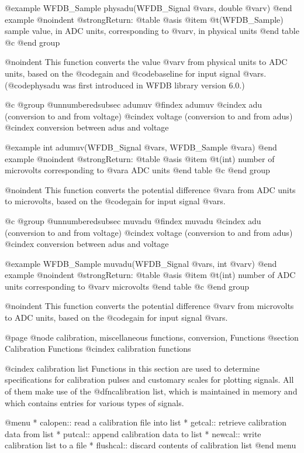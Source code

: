 {{{{{{{{@example
WFDB_Sample physadu(WFDB_Signal @var{s}, double @var{v})
@end example
@noindent
@strong{Return:}
@table @asis
@item @t{(WFDB_Sample)}
sample value, in ADC units, corresponding to @var{v}, in physical units
@end table
@c @end group

@noindent
This function converts the value @var{v} from physical units to ADC
units, based on the @code{gain} and @code{baseline} for input signal
@var{s}.  (@code{physadu} was first introduced in WFDB library version
6.0.)

@c @group
@unnumberedsubsec adumuv
@findex adumuv
@cindex adu (conversion to and from voltage)
@cindex voltage (conversion to and from adus)
@cindex conversion between adus and voltage

@example
int adumuv(WFDB_Signal @var{s}, WFDB_Sample @var{a})
@end example
@noindent
@strong{Return:}
@table @asis
@item @t{(int)}
number of microvolts corresponding to @var{a} ADC units
@end table
@c @end group

@noindent
This function converts the potential difference @var{a} from ADC units to
microvolts, based on the @code{gain} for input signal @var{s}.

@c @group
@unnumberedsubsec muvadu
@findex muvadu
@cindex adu (conversion to and from voltage)
@cindex voltage (conversion to and from adus)
@cindex conversion between adus and voltage

@example
WFDB_Sample muvadu(WFDB_Signal @var{s}, int @var{v})
@end example
@noindent
@strong{Return:}
@table @asis
@item @t{(int)}
number of ADC units corresponding to @var{v} microvolts
@end table
@c @end group

@noindent
This function converts the potential difference @var{v} from microvolts
to ADC units, based on the @code{gain} for input signal @var{s}.

@page
@node     calibration, miscellaneous functions, conversion, Functions
@section Calibration Functions
@cindex calibration functions

@cindex calibration list
Functions in this section are used to determine specifications for
calibration pulses and customary scales for plotting signals.  All of
them make use of the @dfn{calibration list}, which is maintained in
memory and which contains entries for various types of signals.

@menu
* calopen::			read a calibration file into list
* getcal::			retrieve calibration data from list
* putcal::			append calibration data to list
* newcal::			write calibration list to a file
* flushcal::			discard contents of calibration list
@end menu

}}}}}}}}
